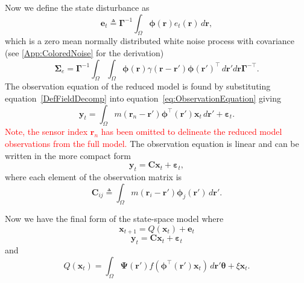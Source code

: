 \documentclass[review,authoryear,3p]{elsarticle}
\newcommand{\dean}[1]{\textcolor{red}{#1}}
\begin{document}
Now we define the state disturbance as
\begin{equation}\label{eq:Wt} 
	\mathbf{e}_t \triangleq \boldsymbol{\Gamma}^{-1}\int_\Omega {\boldsymbol{\phi} ( \mathbf{r} )e_t( \mathbf{r} ) \, d\mathbf{r}},
\end{equation}
which is a zero mean normally distributed white noise process with covariance (see \ref{App:ColoredNoise} for the derivation)
\begin{equation}
	\boldsymbol\Sigma_e =\mathbf{\Gamma}^{-1}\int_{\Omega}\int_{\Omega}\boldsymbol{\phi}\left(\mathbf r\right) \gamma\left(\mathbf r- \mathbf r' \right)\boldsymbol{\phi}\left(\mathbf r'\right)^{\top} \, d\mathbf r' d\mathbf r\mathbf{\Gamma}^{- \top}. 
\end{equation}
The observation equation of the reduced model is found by substituting equation~\ref{DefFieldDecomp} into equation~\ref{eq:ObservationEquation} giving
\begin{equation}\label{eq:ReducedObservationEquation}
	\mathbf{y}_t = \int_{\Omega}{m\left(\mathbf{r}_n-\mathbf{r}'\right)\boldsymbol{\phi}^{\top}\left(\mathbf{r'}\right) \mathbf{x}_t\, d\mathbf{r}'} + \boldsymbol{\varepsilon}_t. 
\end{equation}
\dean{Note, the sensor index $\mathbf{r}_n$ has been omitted to delineate the reduced model observations from the full model.} The observation equation is linear and can be written in the more compact form
\begin{equation}\label{ObservationEquation} 
	\mathbf{y}_t = \mathbf{C}\mathbf{x}_t + \boldsymbol{\varepsilon}_t,
\end{equation}
where each element of the observation matrix is 
\begin{equation}
	\mathbf{C}_{ij} \triangleq \int_{\Omega}m(\mathbf{r}_i - \mathbf{r}')\boldsymbol{\phi}_j(\mathbf{r}') \, d\mathbf{r}'.
\end{equation}

Now we have the final form of the state-space model where
\begin{equation}\label{eq:finalformstatespacemodel}
	\mathbf{x}_{t+1} = Q(\mathbf{x}_t) +\mathbf{e}_t
\end{equation}
\begin{equation} 
	\mathbf{y}_t = \mathbf{C}\mathbf{x}_t + \boldsymbol{\varepsilon}_t
\end{equation}
and 
\begin{equation}\label{eq:QmatrixForSigmapoints}
	Q(\mathbf{x}_t) = \int_\Omega \boldsymbol{\Psi}(\mathbf{r}') f(\boldsymbol{\phi}^{\top}(\mathbf{r}')\mathbf{x}_t) \, d\mathbf{r}' \boldsymbol{\theta} + \xi\mathbf{x}_t.
\end{equation}
\end{document}

